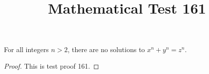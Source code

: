 \documentclass{amsart}
\begin{document}
\title{Mathematical Test 161}
\begin{theorem}
For all integers $n > 2$, there are no solutions to $x^n + y^n = z^n$.
\end{theorem}
\begin{proof}
This is test proof 161.
\end{proof}
\end{document}
